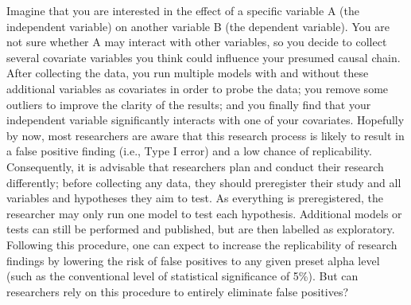 Imagine that you are interested in the effect of a specific variable A (the independent variable) on another variable B (the dependent variable). You are not sure whether A may interact with other variables, so you decide to collect several covariate variables you think could influence your presumed causal chain. After collecting the data, you run multiple models with and without these additional variables as covariates in order to probe the data; you remove some outliers to improve the clarity of the results; and you finally find that your independent variable significantly interacts with one of your covariates. Hopefully by now, most researchers are aware that this research process is likely to result in a false positive finding (i.e., Type I error) and a low chance of replicability. Consequently, it is advisable that researchers plan and conduct their research differently; before collecting any data, they should preregister their study and all variables and hypotheses they aim to test. As everything is preregistered, the researcher may only run one model to test each hypothesis. Additional models or tests can still be performed and published, but are then labelled as exploratory. Following this procedure, one can expect to increase the replicability of research findings by lowering the risk of false positives to any given preset alpha level (such as the conventional level of statistical significance of 5\%). But can researchers rely on this procedure to entirely eliminate false positives? \\

